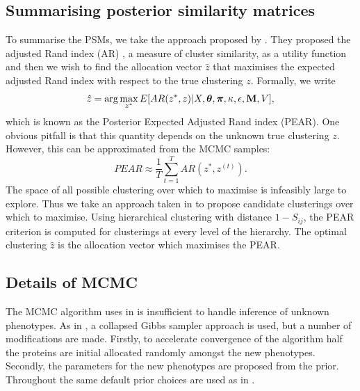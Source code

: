 \documentclass[12pt,english]{article}
\begin{document}
\subsection{Summarising posterior similarity matrices}
To summarise the PSMs, we take the approach proposed by \cite{fritsch::2009}. They proposed the adjusted Rand index (AR) \citep{rand::1971, Hubert::1985}, a measure of cluster similarity, as a utility function and then we wish to find the allocation vector $\hat{z}$ that maximises the expected adjusted Rand index with respect to the true clustering $z$. Formally, we write
\begin{equation}
\hat{z} = \arg \max_{z^*} E[AR(z^*, z)|X, \boldsymbol{\theta}, \boldsymbol{\pi} , \kappa, \epsilon, {\bf M}, V],
\end{equation}
which is known as the Posterior Expected Adjusted Rand index (PEAR). One obvious pitfall is that this quantity depends on the unknown true clustering $z$. However, this can be approximated from the MCMC samples:
\begin{equation}
PEAR \approx \frac{1}{T} \sum_{t = 1}^{T}AR(z^*, z^{(t)}).
\end{equation}
The space of all possible clustering over which to maximise is infeasibly large to explore. Thus we take an approach taken in \cite{fritsch::2009} to propose candidate clusterings over which to maximise. Using hierarchical clustering with distance $1 - S_{ij}$, the PEAR criterion is computed for clusterings at every level of the hierarchy. The optimal clustering $\hat{z}$ is the allocation vector which maximises the PEAR.
\subsection{Details of MCMC}
The MCMC algorithm uses in \cite{Crook:2018} is insufficient to handle inference of unknown phenotypes. As in \cite{Crook:2018}, a collapsed Gibbs sampler approach is used, but a number of modifications are made. Firstly, to accelerate convergence of the algorithm half the proteins are initial allocated randomly amongst the new phenotypes. Secondly, the parameters for the new phenotypes are proposed from the prior. Throughout the same default prior choices are used as in \cite{Crook:2018}.
\end{document}
